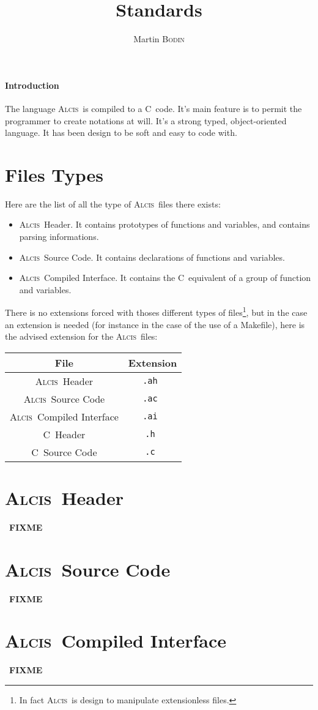 \documentclass{article}
\title{\Alcis Standards}
\author{Martin \textsc{Bodin}}
\date{}
\newcommand{\Alcis}{\textsc{Alcis}~}
\renewcommand{\C}{\textsc{C}~}
\newcommand{\FIXME}{~\textbf{FIXME}~}
\begin{document}
\maketitle

\newpage

\tableofcontents

\newpage

\paragraph{Introduction}
{
    The language \Alcis is compiled to a \C code.
    It’s main feature is to permit the programmer to create notations at will.
    It’s a strong typed, object-oriented language.
    It has been design to be soft and easy to code with.
}

\section{Files Types}

Here are the list of all the type of \Alcis files there exists:
\begin{itemize}
    \item \Alcis Header. It contains prototypes of functions and variables, and contains parsing informations.
    \item \Alcis Source Code. It contains declarations of functions and variables.
    \item \Alcis Compiled Interface. It contains the \C equivalent of a group of function and variables.
\end{itemize}

There is no extensions forced with thoses different types of files\footnote
{
    In fact \Alcis is design to manipulate extensionless files.
}, but in the case an extension is needed (for instance in the case of the use of a Makefile), here is the advised extension for the \Alcis files:

\begin{center}\begin{tabular}{|c||c|}
\hline File & Extension \\
\hline \Alcis Header & \tt .ah \\
\hline \Alcis Source Code & \tt .ac \\
\hline \Alcis Compiled Interface & \tt .ai \\
\hline \C Header & \tt .h \\
\hline \C Source Code & \tt .c \\
\hline
\end{tabular}\end{center}

\section{\Alcis Header}

\FIXME

\section{\Alcis Source Code}

\FIXME

\section{\Alcis Compiled Interface}

\FIXME
\end{document}
